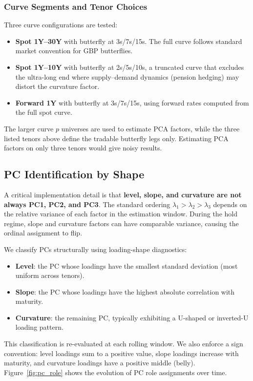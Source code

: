 \documentclass[11pt,a4paper]{article}
\begin{document}
\subsubsection{Curve Segments and Tenor Choices}
Three curve configurations are tested:
\begin{itemize}
  \item \textbf{Spot 1Y--30Y} with butterfly at 3s/7s/15s. The full
        curve follows standard market convention for GBP butterflies.
  \item \textbf{Spot 1Y--10Y} with butterfly at 2s/5s/10s, a
        truncated curve that excludes the ultra-long end where
        supply--demand dynamics (pension hedging) may distort the
        curvature factor.
\item \textbf{Forward 1Y} with butterfly at 3s/7s/15s, using forward
        rates computed from the full spot curve.
\end{itemize}
The larger curve $p$ universes are used to estimate PCA factors, while the three listed tenors above define the tradable butterfly legs only. Estimating PCA factors on only three tenors would give noisy results.

\subsection{PC Identification by Shape}
A critical implementation detail is that \textbf{level, slope, and
curvature are not always PC1, PC2, and PC3}.  The standard ordering
$\lambda_1 > \lambda_2 > \lambda_3$ depends on the relative variance
of each factor in the estimation window.  During the hold regime, slope
and curvature factors can have comparable variance, causing the ordinal
assignment to flip.

We classify PCs structurally using loading-shape diagnostics:
\begin{itemize}
  \item \textbf{Level}: the PC whose loadings have the smallest
        standard deviation (most uniform across tenors).
  \item \textbf{Slope}: the PC whose loadings have the highest
        absolute correlation with maturity.
  \item \textbf{Curvature}: the remaining PC, typically exhibiting a
        U-shaped or inverted-U loading pattern.
\end{itemize}
This classification is re-evaluated at each rolling window.  We also
enforce a sign convention: level loadings sum to a positive value, slope
loadings increase with maturity, and curvature loadings have a positive
middle (belly).
Figure~\ref{fig:pc_role} shows the evolution of PC role assignments
over time.
\end{document}
